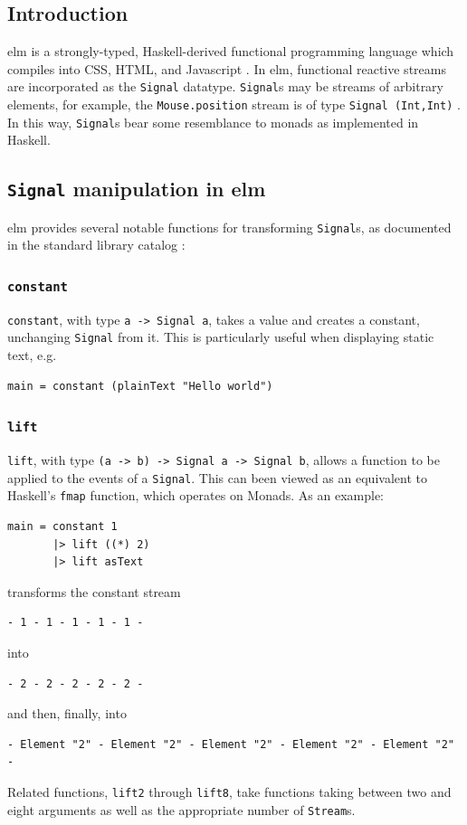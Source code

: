 \documentclass[12pt]{article}
\begin{document}
\subsection{Introduction}
elm is a strongly-typed, Haskell-derived functional programming language which compiles into CSS, HTML, and Javascript \citep{czaplicki_chong_2013}. In elm, functional reactive streams are incorporated as the \texttt{Signal} datatype. \texttt{Signal}s may be streams of arbitrary elements, for example, the \texttt{Mouse.position} stream is of type \texttt{Signal (Int,Int)} \citep*{elm_mouse}. In this way, \texttt{Signal}s bear some resemblance to monads as implemented in Haskell.

\subsection{\texttt{Signal} manipulation in elm}
elm provides several notable functions for transforming \texttt{Signal}s, as documented in the standard library catalog \citep{elm_signal}:
\subsubsection{\texttt{constant}}
\texttt{constant}, with type \texttt{a -> Signal a}, takes a value and creates a constant, unchanging \texttt{Signal} from it. This is particularly useful when displaying static text, e.g.
\begin{verbatim}
main = constant (plainText "Hello world")
\end{verbatim}
\subsubsection{\texttt{lift}}
\texttt{lift}, with type \texttt{(a -> b) -> Signal a -> Signal b}, allows a function to be applied to the events of a \texttt{Signal}. This can been viewed as an equivalent to Haskell's \texttt{fmap} function, which operates on Monads. As an example:
\begin{verbatim}
main = constant 1
       |> lift ((*) 2)
       |> lift asText
\end{verbatim}
transforms the constant stream
\begin{verbatim}
- 1 - 1 - 1 - 1 - 1 -
\end{verbatim}
into
\begin{verbatim}
- 2 - 2 - 2 - 2 - 2 -
\end{verbatim}
and then, finally, into
\begin{verbatim}
- Element "2" - Element "2" - Element "2" - Element "2" - Element "2" -
\end{verbatim}
Related functions, \texttt{lift2} through \texttt{lift8}, take functions taking between two and eight arguments as well as the appropriate number of \texttt{Stream}s.
\end{document}
